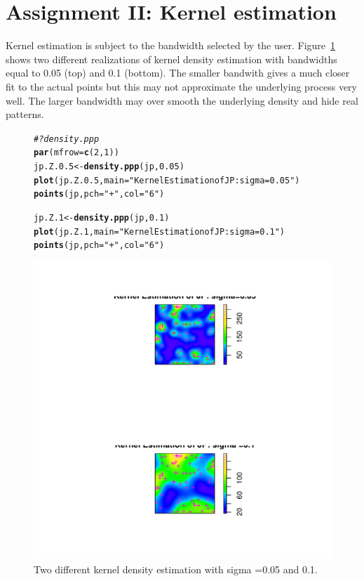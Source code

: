 \documentclass{article}\usepackage[]{graphicx}\usepackage[]{color}
\makeatletter
\def\maxwidth{ %
  \ifdim\Gin@nat@width>\linewidth
    \linewidth
  \else
    \Gin@nat@width
  \fi
}
\newcommand{\hlnum}[1]{\textcolor[rgb]{0.686,0.059,0.569}{#1}}%
\newcommand{\hlstr}[1]{\textcolor[rgb]{0.192,0.494,0.8}{#1}}%
\newcommand{\hlcom}[1]{\textcolor[rgb]{0.678,0.584,0.686}{\textit{#1}}}%
\newcommand{\hlstd}[1]{\textcolor[rgb]{0.345,0.345,0.345}{#1}}%
\newcommand{\hlkwb}[1]{\textcolor[rgb]{0.69,0.353,0.396}{#1}}%
\newcommand{\hlkwc}[1]{\textcolor[rgb]{0.333,0.667,0.333}{#1}}%
\newcommand{\hlkwd}[1]{\textcolor[rgb]{0.737,0.353,0.396}{\textbf{#1}}}%
\newenvironment{kframe}{%
 \def\at@end@of@kframe{}%
 \ifinner\ifhmode%
  \def\at@end@of@kframe{\end{minipage}}%
  \begin{minipage}{\columnwidth}%
 \fi\fi%
 \def\FrameCommand##1{\hskip\@totalleftmargin \hskip-\fboxsep
 \colorbox{shadecolor}{##1}\hskip-\fboxsep
     \hskip-\linewidth \hskip-\@totalleftmargin \hskip\columnwidth}%
 \MakeFramed {\advance\hsize-\width
   \@totalleftmargin\z@ \linewidth\hsize
   \@setminipage}}%
 {\par\unskip\endMakeFramed%
 \at@end@of@kframe}
\newenvironment{knitrout}{}{} %
\makeatother
\begin{document}
\section{Assignment II: Kernel estimation}
Kernel estimation is subject to the bandwidth selected by the user.  Figure~\ref{kern} shows two different realizations of kernel density estimation with bandwidths equal to 0.05 (top) and 0.1 (bottom).  The smaller bandwith gives a much closer fit to the actual points but this may not approximate the underlying process very well.  The larger bandwidth may over smooth the underlying density and hide real patterns.\\
\begin{figure}
\begin{knitrout}
\color{fgcolor}\begin{kframe}
\begin{alltt}
\hlcom{# ?density.ppp}
\hlkwd{par}\hlstd{(}\hlkwc{mfrow}\hlstd{=}\hlkwd{c}\hlstd{(}\hlnum{2}\hlstd{,}\hlnum{1}\hlstd{))}
\hlstd{jp.Z.0.5}\hlkwb{<-}\hlkwd{density.ppp}\hlstd{(jp,} \hlnum{0.05}\hlstd{)}
\hlkwd{plot}\hlstd{(jp.Z.0.5,} \hlkwc{main}\hlstd{=}\hlstr{"Kernel Estimation of JP: sigma=0.05"}\hlstd{)}
\hlkwd{points}\hlstd{(jp,} \hlkwc{pch}\hlstd{=}\hlstr{"+"}\hlstd{,} \hlkwc{col}\hlstd{=}\hlstr{"6"}\hlstd{)}

\hlstd{jp.Z.1}\hlkwb{<-}\hlkwd{density.ppp}\hlstd{(jp,} \hlnum{0.1}\hlstd{)}
\hlkwd{plot}\hlstd{(jp.Z.1,} \hlkwc{main}\hlstd{=}\hlstr{"Kernel Estimation of JP: sigma =0.1"}\hlstd{)}
\hlkwd{points}\hlstd{(jp,} \hlkwc{pch}\hlstd{=}\hlstr{"+"}\hlstd{,} \hlkwc{col}\hlstd{=}\hlstr{"6"}\hlstd{)}
\end{alltt}
\end{kframe}
\includegraphics[width=\maxwidth]{figure/kernelest05} 

\end{knitrout}
\caption{Two different kernel density estimation with sigma =0.05 and 0.1.}
\label{kern}
\end{figure}
\FloatBarrier
\end{document}
